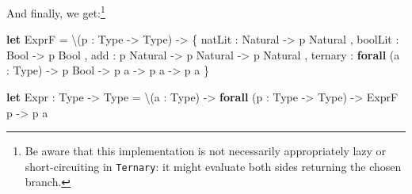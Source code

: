 \documentclass[]{article}
\newenvironment{Shaded}{}{}
\newcommand{\CommentTok}[1]{\textcolor[rgb]{0.38,0.63,0.69}{\textit{#1}}}
\newcommand{\KeywordTok}[1]{\textcolor[rgb]{0.00,0.44,0.13}{\textbf{#1}}}
\newcommand{\NormalTok}[1]{#1}
\newcommand{\OperatorTok}[1]{\textcolor[rgb]{0.40,0.40,0.40}{#1}}
\begin{document}
And finally, we get:\footnote{Be aware that this implementation is not
  necessarily appropriately lazy or short-circuiting in \texttt{Ternary}: it
  might evaluate both sides returning the chosen branch.}

\begin{Shaded}
\begin{Highlighting}[]
\KeywordTok{let}\CommentTok{ }\NormalTok{ExprF}\CommentTok{ }\NormalTok{=}
\CommentTok{      }\OperatorTok{\textbackslash{}}\NormalTok{(p}\CommentTok{ }\NormalTok{:}\CommentTok{ }\NormalTok{Type}\CommentTok{ }\OperatorTok{{-}\textgreater{}}\CommentTok{ }\NormalTok{Type)}\CommentTok{ }\OperatorTok{{-}\textgreater{}}
\CommentTok{        }\NormalTok{\{}\CommentTok{ }\NormalTok{natLit}\CommentTok{ }\NormalTok{:}\CommentTok{ }\NormalTok{Natural}\CommentTok{ }\OperatorTok{{-}\textgreater{}}\CommentTok{ }\NormalTok{p}\CommentTok{ }\NormalTok{Natural}
\CommentTok{        }\NormalTok{,}\CommentTok{ }\NormalTok{boolLit}\CommentTok{ }\NormalTok{:}\CommentTok{ }\NormalTok{Bool}\CommentTok{ }\OperatorTok{{-}\textgreater{}}\CommentTok{ }\NormalTok{p}\CommentTok{ }\NormalTok{Bool}
\CommentTok{        }\NormalTok{,}\CommentTok{ }\NormalTok{add}\CommentTok{ }\NormalTok{:}\CommentTok{ }\NormalTok{p}\CommentTok{ }\NormalTok{Natural}\CommentTok{ }\OperatorTok{{-}\textgreater{}}\CommentTok{ }\NormalTok{p}\CommentTok{ }\NormalTok{Natural}\CommentTok{ }\OperatorTok{{-}\textgreater{}}\CommentTok{ }\NormalTok{p}\CommentTok{ }\NormalTok{Natural}
\CommentTok{        }\NormalTok{,}\CommentTok{ }\NormalTok{ternary}\CommentTok{ }\NormalTok{:}\CommentTok{ }\KeywordTok{forall}\CommentTok{ }\NormalTok{(a}\CommentTok{ }\NormalTok{:}\CommentTok{ }\NormalTok{Type)}\CommentTok{ }\OperatorTok{{-}\textgreater{}}\CommentTok{ }\NormalTok{p}\CommentTok{ }\NormalTok{Bool}\CommentTok{ }\OperatorTok{{-}\textgreater{}}\CommentTok{ }\NormalTok{p}\CommentTok{ }\NormalTok{a}\CommentTok{ }\OperatorTok{{-}\textgreater{}}\CommentTok{ }\NormalTok{p}\CommentTok{ }\NormalTok{a}\CommentTok{ }\OperatorTok{{-}\textgreater{}}\CommentTok{ }\NormalTok{p}\CommentTok{ }\NormalTok{a}
\CommentTok{        }\NormalTok{\}}

\KeywordTok{let}\CommentTok{ }\NormalTok{Expr}
\CommentTok{    }\NormalTok{:}\CommentTok{ }\NormalTok{Type}\CommentTok{ }\OperatorTok{{-}\textgreater{}}\CommentTok{ }\NormalTok{Type}
\CommentTok{    }\NormalTok{=}\CommentTok{ }\OperatorTok{\textbackslash{}}\NormalTok{(a}\CommentTok{ }\NormalTok{:}\CommentTok{ }\NormalTok{Type)}\CommentTok{ }\OperatorTok{{-}\textgreater{}}\CommentTok{ }\KeywordTok{forall}\CommentTok{ }\NormalTok{(p}\CommentTok{ }\NormalTok{:}\CommentTok{ }\NormalTok{Type}\CommentTok{ }\OperatorTok{{-}\textgreater{}}\CommentTok{ }\NormalTok{Type)}\CommentTok{ }\OperatorTok{{-}\textgreater{}}\CommentTok{ }\NormalTok{ExprF}\CommentTok{ }\NormalTok{p}\CommentTok{ }\OperatorTok{{-}\textgreater{}}\CommentTok{ }\NormalTok{p}\CommentTok{ }\NormalTok{a}


\end{Highlighting}
\end{Shaded}
\end{document}
